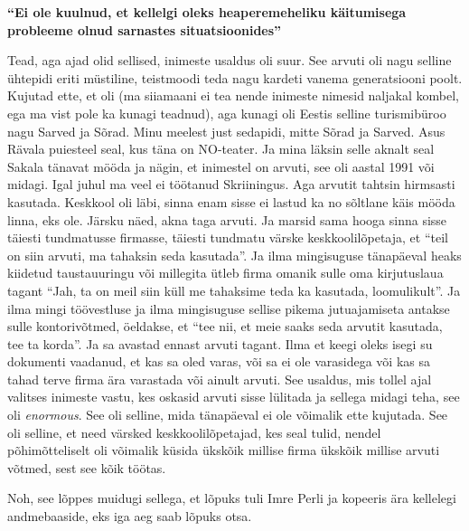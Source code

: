 \textbf{\enquote{Ei ole kuulnud, et kellelgi oleks heaperemeheliku käitumisega probleeme olnud sarnastes situatsioonides}}

Tead, aga ajad olid sellised, inimeste usaldus oli suur. See arvuti oli nagu selline ühtepidi eriti müstiline, teistmoodi teda nagu kardeti vanema generatsiooni poolt. Kujutad ette, et oli (ma siiamaani ei tea nende inimeste nimesid naljakal kombel, ega ma vist pole ka kunagi teadnud), aga kunagi oli Eestis selline turismibüroo nagu Sarved ja Sõrad. Minu meelest just sedapidi, mitte Sõrad ja Sarved. Asus Rävala puiesteel seal, kus täna on NO-teater. Ja mina läksin selle aknalt seal Sakala tänavat mööda ja nägin, et inimestel on arvuti, see oli aastal 1991 või midagi. Igal juhul ma veel ei töötanud Skriiningus. Aga arvutit tahtsin hirmsasti kasutada. Keskkool oli läbi, sinna enam sisse ei lastud ka no sõltlane käis mööda linna, eks ole. Järsku näed, akna taga arvuti. Ja marsid sama hooga sinna sisse täiesti tundmatusse firmasse, täiesti tundmatu värske keskkoolilõpetaja, et \enquote{teil on siin arvuti, ma tahaksin seda kasutada}. Ja ilma mingisuguse tänapäeval heaks kiidetud taustauuringu või millegita ütleb firma omanik sulle oma kirjutuslaua tagant \enquote{Jah, ta on meil siin küll me tahaksime teda ka kasutada, loomulikult}. Ja ilma mingi töövestluse ja ilma mingisuguse sellise pikema jutuajamiseta antakse sulle kontorivõtmed, öeldakse, et \enquote{tee nii, et meie saaks seda arvutit kasutada, tee ta korda}. Ja sa avastad ennast  arvuti tagant. Ilma et keegi oleks isegi su dokumenti vaadanud, et kas sa oled varas, või sa ei ole varasidega või kas sa tahad terve firma ära varastada või ainult arvuti. See usaldus, mis tollel ajal valitses inimeste vastu, kes oskasid arvuti sisse lülitada ja sellega midagi teha, see oli \emph{enormous}. See oli selline, mida tänapäeval ei ole võimalik ette kujutada. See oli selline, et need värsked keskkoolilõpetajad, kes seal tulid, nendel põhimõtteliselt oli võimalik küsida ükskõik millise firma ükskõik millise  arvuti võtmed, sest see kõik töötas. 

Noh, see lõppes muidugi sellega, et lõpuks tuli Imre Perli ja kopeeris ära kellelegi andmebaaside, eks iga aeg saab lõpuks otsa. 

